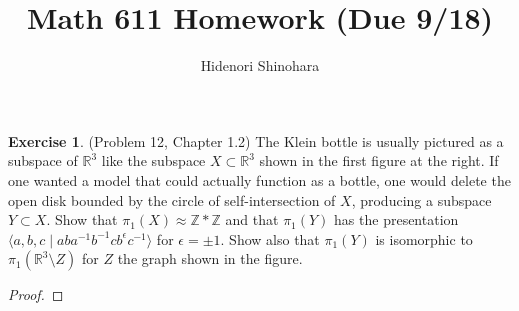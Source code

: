 \documentclass[12pt, psamsfonts]{amsart}
\theoremstyle{definition}
\newtheorem*{exer}{Exercise}
\theoremstyle{remark}
\numberwithin{equation}{section}
\begin{document}
\title{Math 611 Homework (Due 9/18)}
\author{Hidenori Shinohara}
\maketitle


\begin{exer}{(Problem 12, Chapter 1.2)}
  The Klein bottle is usually pictured as a subspace of $\mathbb{R}^3$ like the subspace $X \subset \mathbb{R}^3$ shown in the first figure at the right.
  If one wanted a model that could actually function as a bottle, one would delete the open disk bounded by the circle of self-intersection of $X$, producing a subspace $Y \subset X$.
  Show that $\pi_1(X) \approx \mathbb{Z} * \mathbb{Z}$ and that $\pi_1(Y)$ has the presentation $\langle a, b, c \mid aba^{-1}b^{-1}cb^{\epsilon}c^{-1} \rangle$ for $\epsilon = \pm 1$.
  Show also that $\pi_1(Y)$ is isomorphic to $\pi_1(\mathbb{R}^3 \setminus Z)$ for $Z$ the graph shown in the figure.
\end{exer}

\begin{proof}
\end{proof}
\end{document}
